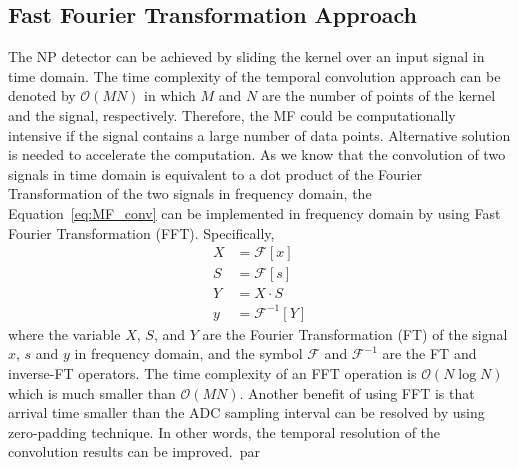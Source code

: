 \subsection{Fast Fourier Transformation Approach}
The NP detector can be achieved by sliding the kernel over an input signal in time domain. The time complexity of the temporal convolution approach can be denoted by $\mathcal{O}(MN)$ in which $M$ and $N$ are the number of points of the kernel and the signal, respectively. Therefore, the MF could be computationally intensive if the signal contains a large number of data points. Alternative solution is needed to accelerate the computation. As we know that the convolution of two signals in time domain is equivalent to a dot product of the Fourier Transformation of the two signals in frequency domain, the Equation~\eqref{eq:MF_conv} can be implemented in frequency domain by using Fast Fourier Transformation (FFT). Specifically, 
\begin{align}
X&=\mathcal{F}[x]\\
S&=\mathcal{F}[s]\\
Y&=X\cdot S\\
y&=\mathcal{F}^{-1}[Y]
\end{align}
where the variable $X$, $S$, and $Y$ are the Fourier Transformation (FT) of the signal $x$, $s$ and $y$ in frequency domain, and the symbol $\mathcal{F}$ and $\mathcal{F}^{-1}$ are the FT and inverse-FT operators. The time complexity of an FFT operation is $\mathcal{O}(N\log N)$ which is much smaller than $\mathcal{O}(MN)$. Another benefit of using FFT is that arrival time smaller than the ADC sampling interval can be resolved by using zero-padding technique. In other words, the temporal resolution of the convolution results can be improved.\ par
